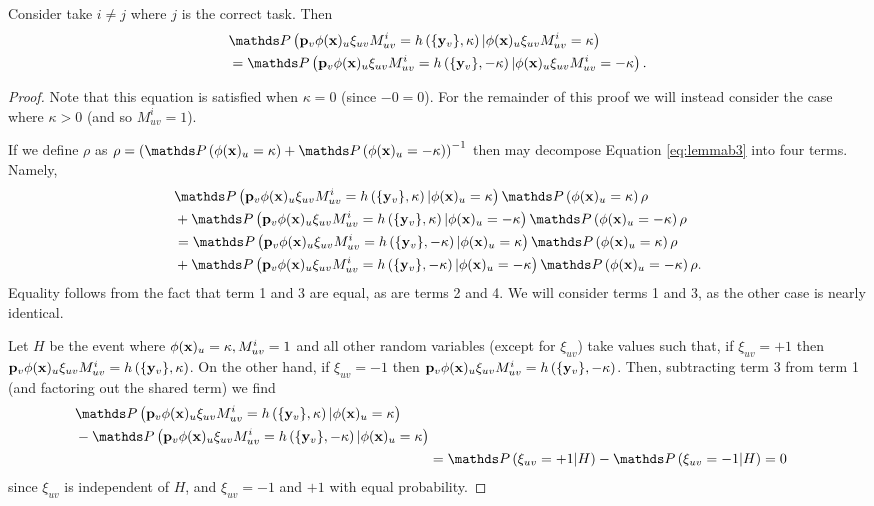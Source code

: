\documentclass{article}
\begin{document}
\begin{lemma}\label{lemma:hprop2}
Consider take $i \neq j$ where $j$ is the correct task. Then
\begin{align}
    \begin{split} \label{eq:lemmab3}
        &\PR{\p_v \phi(\x)_u   \xi_{uv} M_{uv}^i  = h\round{\{\y_v\}, \kappa} | \phi(\x)_u   \xi_{uv} M_{uv}^i = \kappa } \\ &= \PR{\p_v \phi(\x)_u   \xi_{uv} M_{uv}^i  = h\round{\{\y_v\}, -\kappa} | \phi(\x)_u   \xi_{uv} M_{uv}^i = -\kappa}.
    \end{split}
\end{align}
\begin{proof}
Note that this equation is satisfied when $\kappa = 0$ (since $-0 = 0$). For the remainder of this proof we will instead consider the case where $\kappa > 0$ (and so $M_{uv}^i = 1$). 

If we define $\rho$ as $\rho = \round{\PR{\phi(\x)_u = \kappa} + \PR{\phi(\x)_u = -\kappa}}^{-1}$
then may decompose Equation \ref{eq:lemmab3} into four terms. Namely,
\begin{align}
\begin{split}
    & \PR{\p_v \phi(\x)_u   \xi_{uv} M_{uv}^i  = h\round{\{\y_v\},  \kappa} | \phi(\x)_u = \kappa } \PR{\phi(\x)_u = \kappa}\rho \\ 
    &+ \PR{\p_v \phi(\x)_u   \xi_{uv} M_{uv}^i  = h\round{\{\y_v\},  \kappa} | \phi(\x)_u = -\kappa } \PR{\phi(\x)_u = -\kappa} \rho\\
    &=\PR{\p_v \phi(\x)_u   \xi_{uv} M_{uv}^i  = h\round{\{\y_v\},  -\kappa} | \phi(\x)_u = \kappa } \PR{\phi(\x)_u = \kappa}\rho \\ 
    &+ \PR{\p_v \phi(\x)_u   \xi_{uv} M_{uv}^i  = h\round{\{\y_v\},  -\kappa} | \phi(\x)_u = -\kappa } \PR{\phi(\x)_u = -\kappa} \rho.
\end{split}
\end{align}
Equality follows from the fact that term 1 and 3 are equal, as are terms 2 and 4. We will consider terms 1 and 3, as the other case is nearly identical.

Let $H$ be the event where $\phi(\mathbf{x})_u = \kappa, M_{uv}^i = 1$ and all other random variables (except for $\xi_{uv}$) take values such that, if $\xi_{uv} =+1$ then $\mathbf{p}_v \phi(\mathbf{x})_u   \xi_{uv} M_{uv}^i  = h\left( \{\mathbf{y}_v\},  \kappa \right)$. On the other hand, if $\xi_{uv} =-1$ then $\mathbf{p}_v \phi(\mathbf{x})_u   \xi_{uv} M_{uv}^i  = h\left( \{\mathbf{y}_v\},  -\kappa \right)$. Then, subtracting term 3 from term 1 (and factoring out the shared term) we find
\begin{align}
\begin{split}
    &\PR{\p_v \phi(\x)_u   \xi_{uv} M_{uv}^i  = h\round{\{\y_v\},  \kappa} | \phi(\x)_u = \kappa } \\ &- \PR{\p_v \phi(\x)_u   \xi_{uv} M_{uv}^i  = h\round{\{\y_v\},  -\kappa} | \phi(\x)_u = \kappa }
\end{split} \\
&=\PR{  \xi_{uv}  = +1 | H } - \PR{ \xi_{uv}  = -1 | H }  =0
\end{align}
since $\xi_{uv}$ is independent of $H$, and $\xi_{uv}= -1$ and $+1$ with equal probability.
\end{proof}
\end{lemma}
\end{document}
